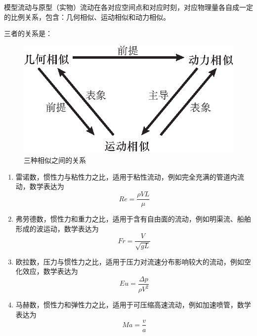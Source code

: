 

\begin{definition}[力学相似]
	模型流动与原型（实物）流动在各对应空间点和对应时刻，对应物理量各自成一定的比例关系，包含：几何相似、运动相似和动力相似。
\end{definition}

三者的关系是：

\begin{figure}[H]
	\centering
	\includegraphics[scale=0.65]{figures/三种相似.eps}
	\caption{三种相似之间的关系}
\end{figure}


\begin{enumerate}
	\item 雷诺数，惯性力与粘性力之比，适用于粘性流动，例如完全充满的管道内流动，数学表达为
	\begin{equation}
		Re = \dfrac{\rho V L}{\mu}
	\end{equation}
    \item 弗劳德数，惯性力和重力之比，适用于含有自由面的流动，例如明渠流、船舶形成的波运动，数学表达为
    \begin{equation}
    	Fr = \dfrac{V}{\sqrt{gL}}
    \end{equation}
    \item 欧拉数，压力与惯性力之比，适用于压力对流速分布影响较大的流动，例如空化效应，数学表达为
    \begin{equation}
    	Eu = \dfrac{\Delta p}{\rho V^2}
    \end{equation}
    \item 马赫数，惯性力和弹性力之比，适用于可压缩高速流动，例如加速喷管，数学表达为
    \begin{equation}
    	Ma = \dfrac{v}{a}
    \end{equation}
\end{enumerate}

